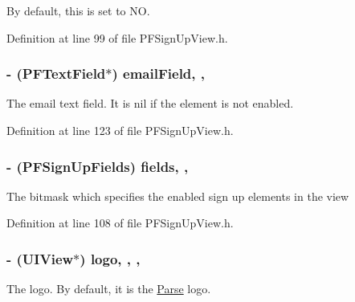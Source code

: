 By default, this is set to {\ttfamily N\+O}. 

Definition at line 99 of file P\+F\+Sign\+Up\+View.\+h.

\hypertarget{interface_p_f_sign_up_view_a4f01a403ba349386d546669a320b81fb}{}
\subsubsection[{email\+Field}]{\setlength{\rightskip}{0pt plus 5cm}-\/ ({\bf P\+F\+Text\+Field}$\ast$) email\+Field\hspace{0.3cm}{\ttfamily [read]}, {\ttfamily [nonatomic]}, {\ttfamily [strong]}}\label{interface_p_f_sign_up_view_a4f01a403ba349386d546669a320b81fb}
The email text field. It is {\ttfamily nil} if the element is not enabled. 

Definition at line 123 of file P\+F\+Sign\+Up\+View.\+h.

\hypertarget{interface_p_f_sign_up_view_a63e26333d686db43da83c0213c3e5229}{}
\subsubsection[{fields}]{\setlength{\rightskip}{0pt plus 5cm}-\/ (P\+F\+Sign\+Up\+Fields) fields\hspace{0.3cm}{\ttfamily [read]}, {\ttfamily [nonatomic]}, {\ttfamily [assign]}}\label{interface_p_f_sign_up_view_a63e26333d686db43da83c0213c3e5229}
The bitmask which specifies the enabled sign up elements in the view 

Definition at line 108 of file P\+F\+Sign\+Up\+View.\+h.

\hypertarget{interface_p_f_sign_up_view_ad3eb048df63f20896124028eb911016a}{}
\subsubsection[{logo}]{\setlength{\rightskip}{0pt plus 5cm}-\/ (U\+I\+View$\ast$) logo\hspace{0.3cm}{\ttfamily [read]}, {\ttfamily [write]}, {\ttfamily [nonatomic]}, {\ttfamily [strong]}}\label{interface_p_f_sign_up_view_ad3eb048df63f20896124028eb911016a}
The logo. By default, it is the \hyperlink{interface_parse}{Parse} logo. 


